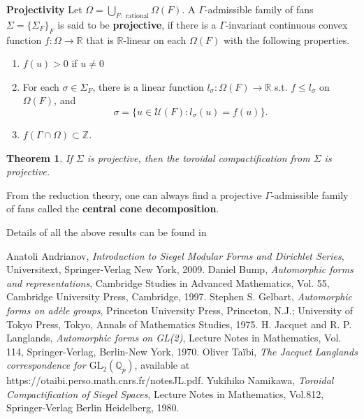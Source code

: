\documentclass[11pt,english]{smfart}
\newtheorem{theorem}{Theorem}
\theoremstyle{definition}
\theoremstyle{remark}
\newcommand{\R}{\mathbb{R}}
\newcommand{\Z}{\mathbb{Z}}
\DeclareMathOperator{\SL}{SL}
\newcommand{\under}{\!\setminus\!}
\renewcommand{\bar}{\overline}
\begin{document}
\noindent\textbf{Projectivity}
Let $\Omega = \bigcup_{F:\text{ rational}}\Omega(F)$.
A $\Gamma$-admissible family of fans $\Sigma = \{\Sigma_F\}_F$ is said to be \textbf{projective}, if there is a $\Gamma$-invariant continuous convex function $f:\Omega\to\R$ that is $\R$-linear on each $\Omega(F)$ with the following properties.
\begin{enumerate}
    \item [(1)] $f(u) > 0$ if $u\neq 0$
    \item [(2)] For each $\sigma\in\Sigma_F$, there is a linear function $l_{\sigma}:\Omega(F)\to\R$ s.t. $f\le l_\sigma$ on $\Omega(F)$, and \[\sigma = \{u\in\mathcal{U}(F): l_\sigma(u) = f(u)\}.\]
    \item [(3)] $f(\Gamma\cap\Omega)\subset\Z$.
\end{enumerate}
\begin{theorem}
    If $\Sigma$ is projective, then the toroidal compactification from $\Sigma$ is projective.
\end{theorem}
From the reduction theory, one can always find a projective $\Gamma$-admissible family of fans called the \textbf{central cone decomposition}.

Details of all the above results can be found in \cite{YN80}





\begin{thebibliography}{10} 
    Anatoli Andrianov, \textit{Introduction to Siegel Modular Forms and Dirichlet Series}, Universitext, Springer-Verlag New York, 2009.
        Daniel Bump, \textit{Automorphic forms and representations}, Cambridge Studies in Advanced Mathematics, Vol. 55, Cambridge University Press, Cambridge, 1997.
          Stephen S. Gelbart, \textit{Automorphic forms on adèle groups}, Princeton University Press, Princeton, N.J.; University of Tokyo Press, Tokyo, Annals of Mathematics Studies, 1975.     H. Jacquet and R. P. Langlands, \textit{Automorphic forms on GL(2)}, Lecture Notes in Mathematics, Vol. 114, Springer-Verlag, Berlin-New York, 1970. 
              Oliver Taïbi, \textit{The Jacquet Langlands correspondence for $\mathrm{GL_2}(\mathbb{Q}_p)$}, available at https://otaibi.perso.math.cnrs.fr/notesJL.pdf.
    Yukihiko Namikawa, \textit{Toroidal Compactification of Siegel Spaces}, Lecture Notes in Mathematics, Vol.812, Springer-Verlag Berlin Heidelberg, 1980.
\end{thebibliography}
\end{document}
